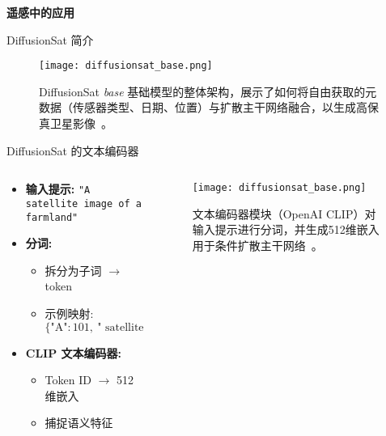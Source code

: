 \begin{refsection}
  \begin{frame}
    \centering
    \vspace{2.5cm}
    {\LARGE \textbf{遥感中的应用}}
  \end{frame}
\end{refsection}


\begin{refsection}
  \begin{frame}{DiffusionSat 简介}
    \begin{figure}
      \centering
      \texttt{[image: diffusionsat\_base.png]}
      \caption{\scriptsize DiffusionSat \emph{base} 基础模型的整体架构，展示了如何将自由获取的元数据（传感器类型、日期、位置）与扩散主干网络融合，以生成高保真卫星影像~\parencite{diffusionset2024}。}
    \end{figure}
    \bottomleftrefs
  \end{frame}
\end{refsection}

\begin{refsection}
  \begin{frame}{DiffusionSat 的文本编码器}
    \begin{columns}[t]
      \begin{column}{0.4\textwidth}
        \small
        \begin{itemize}
          \item \textbf{输入提示:} \texttt{"A satellite image of a farmland"}
          \item \textbf{分词:}
          \begin{itemize}
            \item 拆分为子词 $\rightarrow$ token
            \item 示例映射: \(\{\text{"A"}:101,\ \text{" satellite"}:564,\ \dots,\ \texttt{<EOS>}:102\}\)
          \end{itemize}
          \item \textbf{CLIP 文本编码器:}
          \begin{itemize}
            \item Token ID $\rightarrow$ 512维嵌入
            \item 捕捉语义特征
          \end{itemize}
        \end{itemize}
      \end{column}
      \begin{column}{0.6\textwidth}
        \begin{figure}
          \centering
          \texttt{[image: diffusionsat\_base.png]}
          \caption{\scriptsize 文本编码器模块（OpenAI CLIP）对输入提示进行分词，并生成512维嵌入用于条件扩散主干网络~\parencite{diffusionset2024}。}
        \end{figure}
      \end{column}
    \end{columns}
    \bottomleftrefs
  \end{frame}
\end{refsection}

